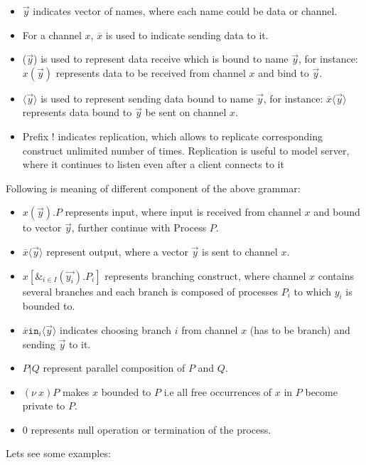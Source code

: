 \documentclass[11pt, pdftex]{article}
\begin{document}
\begin{itemize}
\item $\overrightarrow{y}$ indicates vector of names, where each name could be data or channel.
\item For a channel $x$, $\overline{x}$ is used to indicate sending data to it.
\item ($\overrightarrow{y}$) is used to represent data receive which is bound to name $\overrightarrow{y}$, for instance: $x(\overrightarrow{y})$ represents data to be received from channel $x$ and bind to $\overrightarrow{y}$.
\item $\langle\overrightarrow{y}\rangle$ is used to represent sending data bound to name $\overrightarrow{y}$, for instance: $\overline{x}\langle \overrightarrow{y} \rangle$ represents data bound to $\overrightarrow{y}$  be sent on channel $x$.
\item Prefix ! indicates replication, which allows to replicate corresponding construct unlimited number of times. Replication is useful to model server, where it continues to listen even after a client connects to it
\end{itemize}
Following is meaning of different component of the above grammar:
\begin{itemize}
\item $x(\overrightarrow{y}).P$ represents input, where input is received from channel $x$ and bound to vector $\overrightarrow{y}$, further continue with Process $P$. 
\item $\overline{x}\langle\overrightarrow{y}\rangle $  represent output, where a vector $\overrightarrow{y}$ is sent to channel $x$. 
\item $x[\&_{i \in I}(\overrightarrow{y_{i}}).P_{i}]$ represents branching construct, where channel $x$ contains several branches and each branch is composed of processes $P_{i}$ to which $y_{i}$ is bounded to. 
\item $\overline{x}\texttt{in}_{i}\langle\overrightarrow{y}\rangle$ indicates choosing branch $i$ from channel $x$ (has to be branch) and sending $\overrightarrow{y}$ to it.
\item $P|Q$ represent parallel composition of $P$ and $Q$.
\item $(\nu\ x)P$ makes $x$ bounded to $P$ i.e all free occurrences of $x$ in $P$ become private to $P$. 
\item $0$ represents null operation or termination of the process.
\end{itemize}
Lets see some examples:
\end{document}
